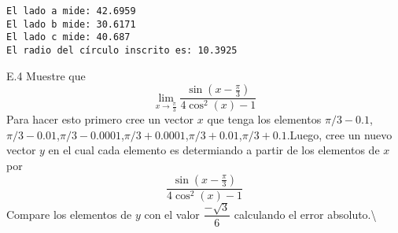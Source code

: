 \documentclass[11pt]{report}
\begin{document}
    \begin{Verbatim}[commandchars=\\\{\}]
El lado a mide: 42.6959
El lado b mide: 30.6171
El lado c mide: 40.687
El radio del círculo inscrito es: 10.3925
    \end{Verbatim}

    E.4 Muestre que \[
\lim_{x \rightarrow \frac{\pi}{3}} \dfrac{\sin(x- \frac{\pi}{3})}{4 \cos^2(x)-1}
\] Para hacer esto primero cree un vector \(x\) que tenga los elementos
\(\pi / 3 -0.1\),\(\pi / 3 - 0.01\),\(\pi / 3 - 0.0001\),\(\pi / 3 + 0.0001\),\(\pi / 3 + 0.01\),\(\pi / 3 + 0.1\).Luego,
cree un nuevo vector \(y\) en el cual cada elemento es determiando a
partir de los elementos de \(x\) por \[
\dfrac{\sin(x- \frac{\pi}{3})}{4 \cos^2(x)-1}
\] Compare los elementos de \(y\) con el valor \(\dfrac{- \sqrt{3}}{6}\)
calculando el error absoluto.\textbackslash{}
\end{document}
